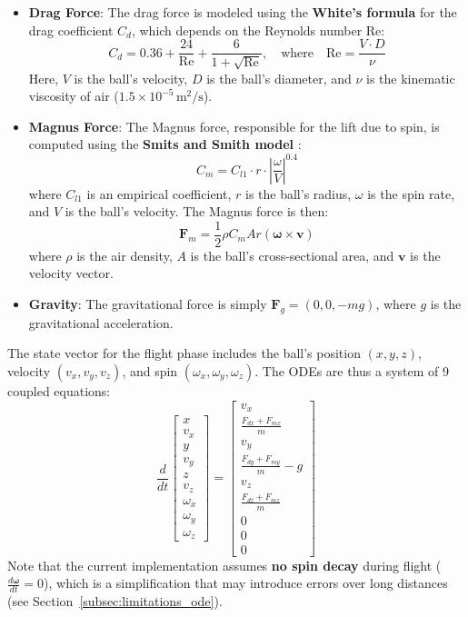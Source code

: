 \documentclass[10pt,a4paper]{report}
\begin{document}
\begin{itemize}
    \item \textbf{Drag Force}:
    The drag force is modeled using the \textbf{White's formula} for the drag coefficient \( C_d \), which depends on the Reynolds number \( \text{Re} \):
    \[
    C_d = 0.36 + \frac{24}{\text{Re}} + \frac{6}{1 + \sqrt{\text{Re}}}, \quad \text{where} \quad \text{Re} = \frac{V \cdot D}{\nu}
    \]
    Here, \( V \) is the ball's velocity, \( D \) is the ball's diameter, and \( \nu \) is the kinematic viscosity of air (\( 1.5 \times 10^{-5} \, \text{m}^2/\text{s} \)).

    \item \textbf{Magnus Force}:
    The Magnus force, responsible for the lift due to spin, is computed using the \textbf{Smits and Smith model} \cite{smits1994aerodynamic}:
    \[
    C_m = C_{l1} \cdot r \cdot \left| \frac{\omega}{V} \right|^{0.4}
    \]
    where \( C_{l1} \) is an empirical coefficient, \( r \) is the ball's radius, \( \omega \) is the spin rate, and \( V \) is the ball's velocity. The Magnus force is then:
    \[
    \mathbf{F}_m = \frac{1}{2} \rho C_m A r (\boldsymbol{\omega} \times \mathbf{v})
    \]
    where \( \rho \) is the air density, \( A \) is the ball's cross-sectional area, and \( \mathbf{v} \) is the velocity vector.

    \item \textbf{Gravity}:
    The gravitational force is simply \( \mathbf{F}_g = (0, 0, -mg) \), where \( g \) is the gravitational acceleration.
\end{itemize}

The state vector for the flight phase includes the ball's position \((x, y, z)\), velocity \((v_x, v_y, v_z)\), and spin \((\omega_x, \omega_y, \omega_z)\). The ODEs are thus a system of 9 coupled equations:
\[
\frac{d}{dt}
\begin{bmatrix}
x \\ v_x \\ y \\ v_y \\ z \\ v_z \\ \omega_x \\ \omega_y \\ \omega_z
\end{bmatrix}
=
\begin{bmatrix}
v_x \\
\frac{F_{dx} + F_{mx}}{m} \\
v_y \\
\frac{F_{dy} + F_{my}}{m} - g \\
v_z \\
\frac{F_{dz} + F_{mz}}{m} \\
0 \\
0 \\
0
\end{bmatrix}
\]
Note that the current implementation assumes \textbf{no spin decay} during flight (\( \frac{d\boldsymbol{\omega}}{dt} = 0 \)), which is a simplification that may introduce errors over long distances (see Section~\ref{subsec:limitations_ode}).
\end{document}
